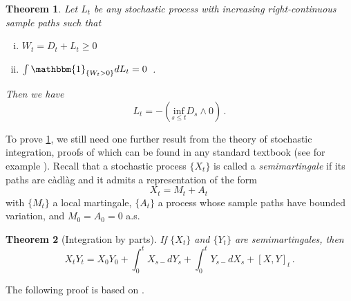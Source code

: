\documentclass[titlepage]{article}
\theoremstyle{plain}
\newtheorem{theorem}{Theorem}[section]
\theoremstyle{definition}
\begin{document}
\begin{theorem} \label{thm:regulator}
  Let $L_t$ be any stochastic process with increasing right-continuous sample paths such that
  \begin{enumerate}[(i)]
    \item $W_t = D_t + L_t \geq 0$ \label{cond:regulator-i}
    \item $\int \mathbbm{1}_{\{ W_t > 0 \}} dL_t = 0$ \,. \label{cond:regulator-ii}
  \end{enumerate}
  Then we have
  \begin{equation} \label{eq:reflection}
    L_t = -(\underset{s \leq t}{\mathrm{inf}} D_s \wedge 0) \,.
  \end{equation}
\end{theorem}

To prove \cref{thm:regulator}, we still need one further result from the theory of stochastic integration, proofs of which can be found in any standard textbook (see for example \cite[Theorem 3.17]{liptser}). Recall that a stochastic process $\{ X_t \}$ is called a \emph{semimartingale} if its paths are c\`adl\`ag and it admits a representation of the form
\begin{equation}
  X_t = M_t + A_t \,
\end{equation}
with $\{ M_t \}$ a local martingale, $\{ A_t \}$ a process whose sample paths have bounded variation, and $M_0 = A_0 = 0$ a.s.

\begin{theorem}[Integration by parts] \label{thm:int-by-parts}
  If $\{ X_t \}$ and $\{ Y_t \}$ are semimartingales, then
  \begin{equation}
    X_t Y_t = X_0 Y_0 + \int_0^t X_{s-} d Y_s + \int_0^t Y_{s-} d X_s + [X, Y]_t \,.
  \end{equation}
\end{theorem}

The following proof is based on \cite[Proposition 2.3]{andersen}.
\end{document}
